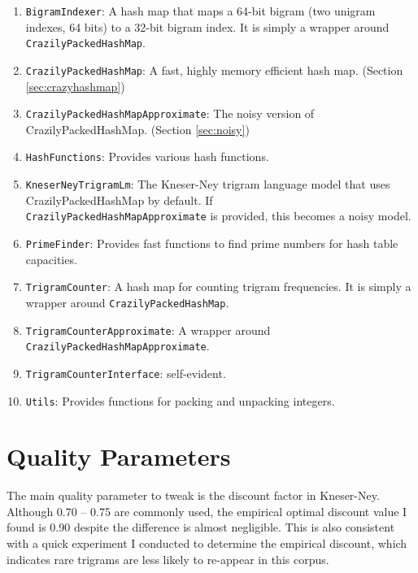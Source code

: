 \documentclass[12pt]{article}   %
\begin{document}
\begin{enumerate}
	\item \texttt{BigramIndexer}: A hash map that maps a 64-bit bigram (two unigram indexes, 64 bits) to a 32-bit bigram index. It is simply a wrapper around \texttt{CrazilyPackedHashMap}.
	\item \texttt{CrazilyPackedHashMap}: A fast, highly memory efficient hash map. (Section \ref{sec:crazyhashmap})
	\item \texttt{CrazilyPackedHashMapApproximate}: The noisy version of CrazilyPackedHashMap. (Section \ref{sec:noisy})
	\item \texttt{HashFunctions}: Provides various hash functions.
	\item \texttt{KneserNeyTrigramLm}: The Kneser-Ney trigram language model that uses CrazilyPackedHashMap by default. If \\ \texttt{CrazilyPackedHashMapApproximate} is provided, this becomes a noisy model.
	\item \texttt{PrimeFinder}: Provides fast functions to find prime numbers for hash table capacities.
	\item \texttt{TrigramCounter}: A hash map for counting trigram frequencies. It is simply a wrapper around \texttt{CrazilyPackedHashMap}.
	\item \texttt{TrigramCounterApproximate}: A wrapper around \\ \texttt{CrazilyPackedHashMapApproximate}.
	\item \texttt{TrigramCounterInterface}: self-evident.
	\item \texttt{Utils}: Provides functions for packing and unpacking integers.
\end{enumerate}



\section{Quality Parameters}
The main quality parameter to tweak is the discount factor in Kneser-Ney. Although 0.70 -- 0.75 are commonly used, the empirical optimal discount value I found is 0.90 despite the difference is almost negligible. This is also consistent with a quick experiment I conducted to determine the empirical discount, which indicates rare trigrams are less likely to re-appear in this corpus.
\end{document}

